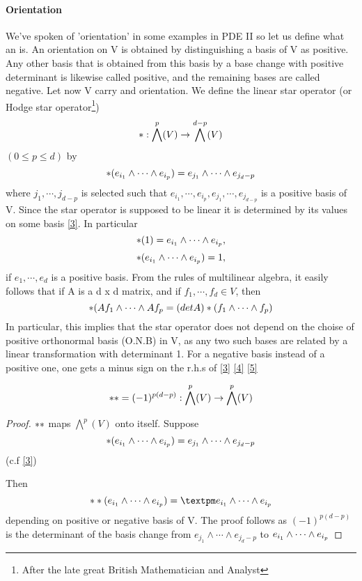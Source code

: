   \paragraph{Orientation}
We've spoken of 'orientation' in some examples in PDE II so let us define what an  is.
An orientation on V is obtained by distinguishing a basis of V as positive. Any other basis that is obtained from this basis
by a base change with positive determinant is likewise called positive, and the remaining bases are called negative.
Let now V carry and orientation. We define the linear star operator (or Hodge star operator\footnote{After the late great
British Mathematician and Analyst})
$$*:\bigwedge^p(V) \to \bigwedge^{d-p}(V)$$ $(0 \leq p \leq d)$
by 
\begin{equation}\label{3}
 *(e_{i_1}\wedge \cdots \wedge e_{i_p}) = e_{j_1}\wedge \cdots \wedge e_{j_d-p}
\end{equation}
where $j_1,\cdots,j_{d-p}$ is selected such that $e_{i_1},\cdots,e_{i_p},e_{j_1},\cdots,e_{j_{d-p}}$ is a positive
basis of V. Since the star operator is supposed to be linear it is determined by its values on some basis \eqref{3}.
In particular 
\begin{equation}\label{4}
  *(1) = e_{i_1}\wedge \cdots \wedge e_{i_p},
\end{equation}
\begin{equation}\label{5}
 *(e_{i_1}\wedge \cdots \wedge e_{i_p}) = 1,
\end{equation}
if $e_1,\cdots,e_d$ is a positive basis. 
        From the rules of multilinear algebra, it easily follows that if A is a d x d matrix, and if $f_1,\cdots,f_d \in V$,
then 
$$*(Af_1\wedge\cdots\wedge Af_p = (det A)*(f_1\wedge\cdots\wedge f_p)$$
In particular, this implies that the star operator does not depend on the choise of positive orthonormal basis (O.N.B) in V, as
any two such bases are related by a linear transformation with determinant 1.
For a negative basis instead of a positive one, one gets a minus sign on the r.h.s of  \eqref{3} \eqref{4} \eqref{5}
\begin{lem}
 \begin{equation*}
  * * = (-1)^{p(d-p)} : \bigwedge^p(V) \to \bigwedge^p(V)
 \end{equation*}
\begin{proof}
 $* *$ maps $\bigwedge^p(V)$ onto itself. Suppose
$$*(e_{i_1}\wedge \cdots \wedge e_{i_p})=e_{j_1}\wedge \cdots \wedge e_{j_d-p}$$ (c.f \eqref{3})

Then $$\hodge \hodge (\eee) = \textpm \eee$$
depending on positive or negative basis of V.
The proof follows as $(-1)^{p(d-p)}$ is the determinant of the basis change from $e_{j_1}\wedge \cdots \wedge e_{j_d-p}$ to
$e_{i_1}\wedge \cdots \wedge e_{i_p}$
 \end{proof}

\end{lem}
